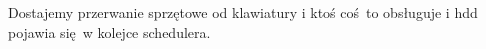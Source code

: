 Dostajemy przerwanie sprzętowe od klawiatury i ktoś coś to obsługuje i hdd pojawia się w kolejce schedulera.